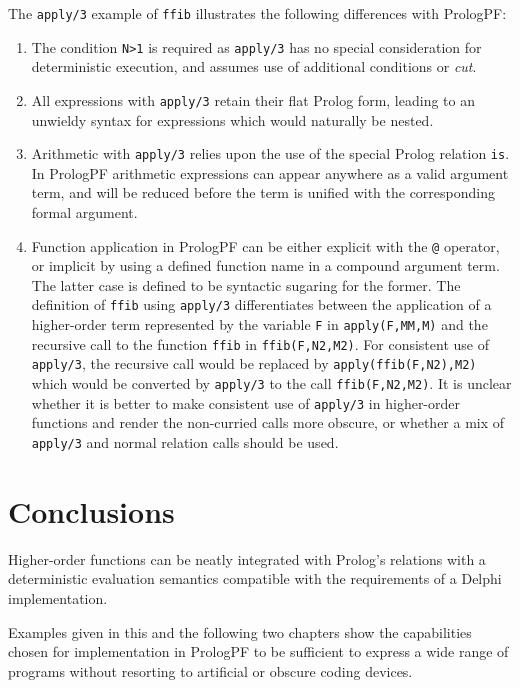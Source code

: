 \begin{enumerate}
{  The \texttt{apply/3} example
  of \texttt{ffib} illustrates the following differences with PrologPF:
  \begin{enumerate}
  \item{The condition \texttt{N>1} is required as \texttt{apply/3} has no
    special consideration for deterministic execution, and assumes use of 
    additional conditions or \textit{cut}.}
  \item{All expressions with \texttt{apply/3} retain their flat Prolog form,
    leading to an unwieldy syntax for expressions which would naturally be
    nested.}
  \item{Arithmetic with \texttt{apply/3} relies upon the use of the special
    Prolog relation \texttt{is}.  In PrologPF arithmetic expressions can appear
    anywhere as a valid argument term, and will be reduced before the term
    is unified with the corresponding formal argument.}
  \item{Function application in PrologPF can be either explicit with the
    \texttt{@} operator, or implicit by using a defined function name in
    a compound argument term.  The latter case is defined to be syntactic
    sugaring for the former.  The definition of \texttt{ffib} using 
    \texttt{apply/3} differentiates between the application of a higher-order
    term represented by the variable \texttt{F} in \texttt{apply(F,MM,M)} and
    the recursive call to the function \texttt{ffib} in \texttt{ffib(F,N2,M2)}.
    For consistent use of \texttt{apply/3}, the recursive call would be
    replaced by \texttt{apply(ffib(F,N2),M2)} which would be converted by
    \texttt{apply/3} to the call \texttt{ffib(F,N2,M2)}.  It is unclear whether
    it is better to make consistent use of \texttt{apply/3} in higher-order
    functions and render the non-curried calls more obscure, or whether a mix
    of \texttt{apply/3} and normal relation calls should be used.}
  \end{enumerate}}
\end{enumerate}

\section{Conclusions} %

Higher-order functions can be neatly integrated with Prolog's relations
with a deterministic evaluation semantics compatible with the requirements
of a Delphi implementation.

Examples given in this and the following two chapters show the capabilities
chosen for implementation in PrologPF to be sufficient to express a wide range
of programs without resorting to artificial or obscure coding devices.

